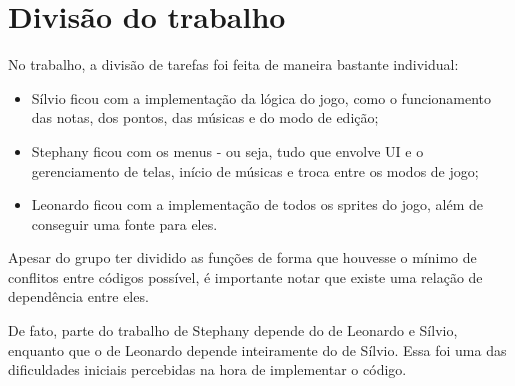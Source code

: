 \section{Divisão do trabalho}

    No trabalho, a divisão de tarefas foi feita de maneira bastante individual:
    \begin{itemize}
        \item Sílvio ficou com a implementação da lógica do jogo, como o funcionamento das notas, dos pontos, das músicas e do modo de edição;
        \item Stephany ficou com os menus - ou seja, tudo que envolve UI e o gerenciamento de telas, início de músicas e troca entre os modos de jogo;
        \item Leonardo ficou com a implementação de todos os sprites do jogo, além de conseguir uma fonte para eles.
    \end{itemize}

    Apesar do grupo ter dividido as funções de forma que houvesse o mínimo de conflitos entre códigos possível, é importante notar que existe uma relação de dependência entre eles.

    De fato, parte do trabalho de Stephany depende do de Leonardo e Sílvio, enquanto que o de Leonardo depende inteiramente do de Sílvio. Essa foi uma das dificuldades iniciais percebidas na hora de implementar o código.
